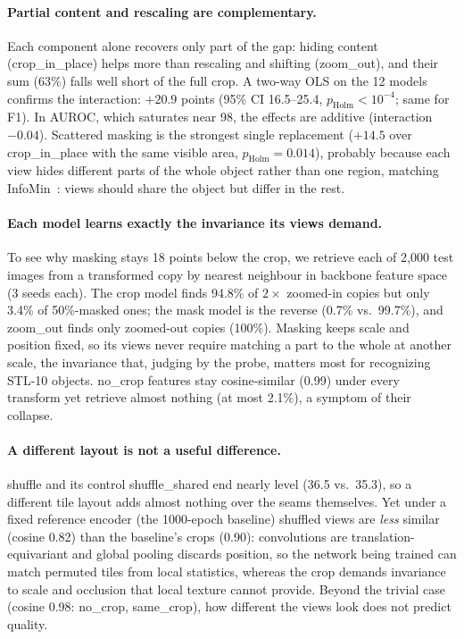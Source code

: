 \documentclass[10pt,twocolumn,letterpaper]{article}
\begin{document}
\paragraph{Partial content and rescaling are complementary.}
Each component alone recovers only part of the gap: hiding content (crop\_in\_place) helps more than rescaling and shifting (zoom\_out), and their sum (63\%) falls well short of the full crop. A two-way OLS on the 12 models confirms the interaction: $+20.9$ points (95\% CI 16.5--25.4, $p_\text{Holm}<10^{-4}$; same for F1). In AUROC, which saturates near 98, the effects are additive (interaction $-0.04$).
Scattered masking is the strongest single replacement ($+14.5$ over crop\_in\_place with the same visible area, $p_\text{Holm}{=}0.014$), probably because each view hides different parts of the whole object rather than one region, matching InfoMin~\cite{tian2020infomin}: views should share the object but differ in the rest.

\paragraph{Each model learns exactly the invariance its views demand.}
To see why masking stays 18 points below the crop, we retrieve each of 2,000 test images from a transformed copy by nearest neighbour in backbone feature space (3 seeds each).
The crop model finds 94.8\% of $2\times$ zoomed-in copies but only 3.4\% of 50\%-masked ones; the mask model is the reverse (0.7\% vs.\ 99.7\%), and zoom\_out finds only zoomed-out copies (100\%).
Masking keeps scale and position fixed, so its views never require matching a part to the whole at another scale, the invariance that, judging by the probe, matters most for recognizing STL-10 objects.
no\_crop features stay cosine-similar (0.99) under every transform yet retrieve almost nothing (at most 2.1\%), a symptom of their collapse.

\paragraph{A different layout is not a useful difference.}
shuffle and its control shuffle\_shared end nearly level (36.5 vs.\ 35.3), so a different tile layout adds almost nothing over the seams themselves.
Yet under a fixed reference encoder (the 1000-epoch baseline) shuffled views are \emph{less} similar (cosine 0.82) than the baseline's crops (0.90): convolutions are translation-equivariant and global pooling discards position, so the network being trained can match permuted tiles from local statistics, whereas the crop demands invariance to scale and occlusion that local texture cannot provide.
Beyond the trivial case (cosine 0.98: no\_crop, same\_crop), how different the views look does not predict quality.
\end{document}
